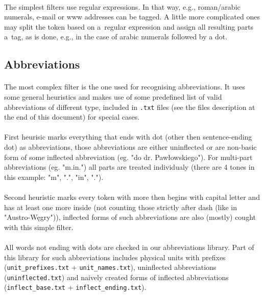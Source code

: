 \documentclass[oneside,12pt]{article}
\begin{document}
\paragraph{}
The simplest filters use regular expressions. In that way, e.g., roman/arabic numerals, e-mail or www addresses can be tagged. A little more complicated ones may split the token based on a~regular expression and assign all resulting parts a~tag, as is done, e.g., in the case of arabic numerals followed by a dot.

\subsection{Abbreviations}

\paragraph{}
The most complex filter is the one used for recognising abbreviations. It uses some general heuristics and makes use of some predefined list of valid abbreviations of different type, included in \texttt{.txt} files (see the files description at the end of this document) for special cases.

\paragraph{}
First heurisic marks everything that ends with dot (other then sentence-ending dot) as abbreviations, those abbreviations are either uninflected or are non-basic form of some inflected abbreviation (eg. "do dr. Pawłowskiego"). For multi-part abbreviations (eg. "m.in.") all parts are treated individualy (there are 4 tones in this example: "m", ".", "in", ".").

\paragraph{}
Second heuristic marks every token with more then begins with capital letter and has at least one more inside (not counting those strictly after dash (like in "Austro-Węgry")), inflected forms of such abbreviations are also (mostly) cought with this simple filter.

\paragraph{}
All words not ending with dots are checked in our abbreviations library. Part of this library for such abbreviations includes physical units with prefixes (\texttt{unit\_prefixes.txt} + \texttt{unit\_names.txt}), uninflected abbreviations (\texttt{uninflected.txt}) and naively created forms of inflected abbreviations (\texttt{inflect\_base.txt} + \texttt{inflect\_ending.txt}).
\end{document}
